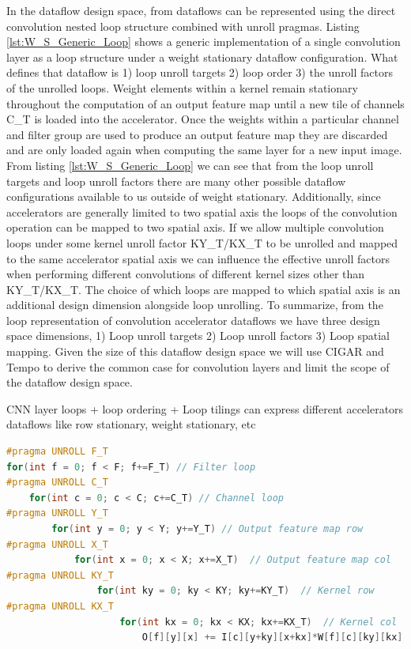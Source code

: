 In the dataflow design space, from \cite{dnn_df_overrated} 
dataflows can be represented using the direct convolution
nested loop structure combined with unroll pragmas. Listing \ref{lst:W_S_Generic_Loop} shows a generic
implementation of a single convolution layer as a loop structure under a weight
stationary dataflow configuration. What defines that dataflow is 1) loop unroll
targets 2) loop order 3) the unroll factors of the unrolled loops. Weight elements within a
kernel remain stationary throughout the computation of an output feature map
until a new tile of channels C\_T is loaded into the accelerator. Once the
weights within a particular channel and filter group are used to produce an
output feature map they are discarded and are only loaded again when computing
the same layer for a new input image. From listing \ref{lst:W_S_Generic_Loop} we
can see that from the loop unroll targets and loop unroll factors there are many
other possible dataflow configurations available to us outside of weight
stationary. Additionally, since accelerators are generally limited to two
spatial axis the loops of the convolution operation can be mapped to two spatial
axis. If we allow multiple convolution loops under some kernel unroll factor
KY\_T/KX\_T  to be unrolled and mapped to the same accelerator spatial axis we
can influence the effective unroll factors when performing different
convolutions of different kernel sizes other than KY\_T/KX\_T. The choice of
which loops are mapped to which spatial axis is an additional design dimension
alongside loop unrolling. To summarize, from the loop representation of
convolution accelerator dataflows we have three design space dimensions, 1) Loop
unroll targets 2) Loop unroll factors 3) Loop spatial mapping. Given the size of
this dataflow design space we will use CIGAR and Tempo to derive the common
case for convolution layers and limit the scope of the dataflow design space.

CNN layer loops + loop ordering + Loop tilings can express different
accelerators dataflows like row stationary, weight stationary, etc



\begin{minipage}{\linewidth}
    \begin{lstlisting}[language=C, caption=Convolution implemented as nested loops, label={lst:conv_loop}]
#pragma UNROLL F_T
for(int f = 0; f < F; f+=F_T) // Filter loop
#pragma UNROLL C_T
    for(int c = 0; c < C; c+=C_T) // Channel loop
#pragma UNROLL Y_T
        for(int y = 0; y < Y; y+=Y_T) // Output feature map row
#pragma UNROLL X_T
            for(int x = 0; x < X; x+=X_T)  // Output feature map col
#pragma UNROLL KY_T
                for(int ky = 0; ky < KY; ky+=KY_T)  // Kernel row
#pragma UNROLL KX_T
                    for(int kx = 0; kx < KX; kx+=KX_T)  // Kernel col
                        O[f][y][x] += I[c][y+ky][x+kx]*W[f][c][ky][kx];
    \end{lstlisting}
\end{minipage}


